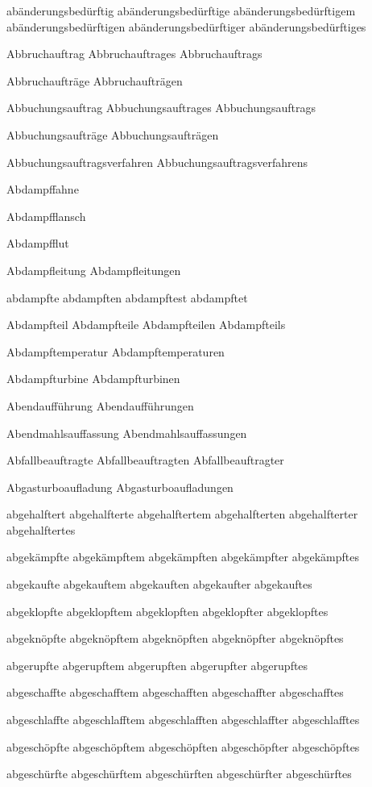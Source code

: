 abänderungsbedürftig
abänderungsbedürftige
abänderungsbedürftigem
abänderungsbedürftigen
abänderungsbedürftiger
abänderungsbedürftiges

Abbruchauftrag
Abbruchauftrages
Abbruchauftrags

Abbruchaufträge
Abbruchaufträgen

Abbuchungsauftrag
Abbuchungsauftrages
Abbuchungsauftrags

Abbuchungsaufträge
Abbuchungsaufträgen

Abbuchungsauftragsverfahren
Abbuchungsauftragsverfahrens

Abdampffahne

Abdampfflansch

Abdampfflut

Abdampfleitung
Abdampfleitungen

abdampfte
abdampften
abdampftest
abdampftet

Abdampfteil
Abdampfteile
Abdampfteilen
Abdampfteils

Abdampftemperatur
Abdampftemperaturen

Abdampfturbine
Abdampfturbinen

Abendaufführung
Abendaufführungen

Abendmahlsauffassung
Abendmahlsauffassungen

Abfallbeauftragte
Abfallbeauftragten
Abfallbeauftragter

Abgasturboaufladung
Abgasturboaufladungen

abgehalftert
abgehalfterte
abgehalftertem
abgehalfterten
abgehalfterter
abgehalftertes

abgekämpfte
abgekämpftem
abgekämpften
abgekämpfter
abgekämpftes

abgekaufte
abgekauftem
abgekauften
abgekaufter
abgekauftes

abgeklopfte
abgeklopftem
abgeklopften
abgeklopfter
abgeklopftes

abgeknöpfte
abgeknöpftem
abgeknöpften
abgeknöpfter
abgeknöpftes

abgerupfte
abgerupftem
abgerupften
abgerupfter
abgerupftes

abgeschaffte
abgeschafftem
abgeschafften
abgeschaffter
abgeschafftes

abgeschlaffte
abgeschlafftem
abgeschlafften
abgeschlaffter
abgeschlafftes

abgeschöpfte
abgeschöpftem
abgeschöpften
abgeschöpfter
abgeschöpftes

abgeschürfte
abgeschürftem
abgeschürften
abgeschürfter
abgeschürftes

